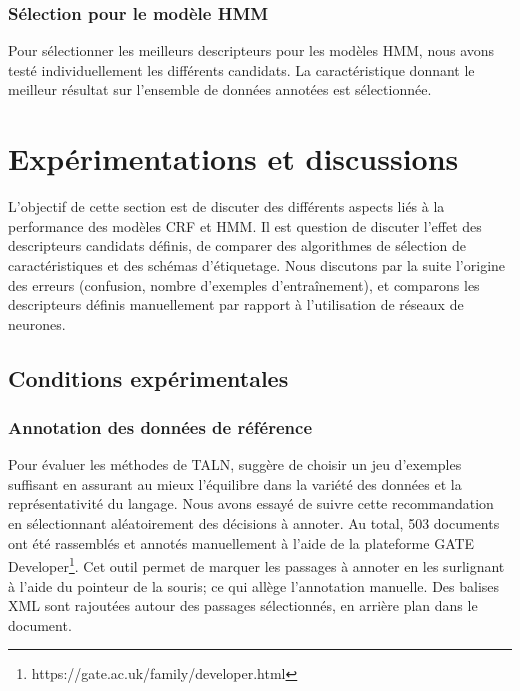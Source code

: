 \subsubsection{Sélection pour le modèle HMM} Pour sélectionner les meilleurs descripteurs pour les modèles HMM, nous avons testé individuellement les différents candidats. La caractéristique donnant le meilleur résultat sur l'ensemble de données annotées est sélectionnée.

\section{Expérimentations et discussions}

L'objectif de cette section est de discuter des différents aspects liés à la performance des modèles CRF et HMM. Il est question de discuter l'effet des descripteurs candidats définis, de comparer des algorithmes de sélection de caractéristiques et des schémas d'étiquetage. Nous discutons par la suite l'origine des erreurs (confusion, nombre d'exemples d'entraînement), et comparons les descripteurs définis manuellement par rapport à l'utilisation de réseaux de neurones.

\label{sec:structuration:experimentations}
\subsection{Conditions expérimentales}
\subsubsection{Annotation des données de référence}
Pour évaluer les méthodes de TALN, \citet{xiao2010corpuscreation} suggère de choisir un jeu d'exemples suffisant en assurant au mieux l'équilibre dans la variété des données et la représentativité du langage. Nous avons essayé de suivre cette recommandation  en sélectionnant aléatoirement des décisions à annoter. Au total, 503 documents ont été rassemblés et annotés manuellement à l'aide de la plateforme GATE Developer\footnote{https://gate.ac.uk/family/developer.html}. Cet outil permet de marquer les passages à annoter en les surlignant à l'aide du pointeur de la souris; ce qui allège  l'annotation manuelle. Des balises XML sont rajoutées autour des passages sélectionnés, en arrière plan dans le document.

